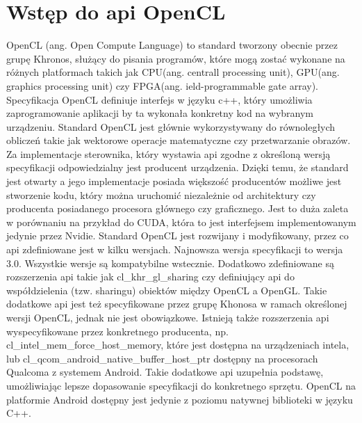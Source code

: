 \section[Wstęp do api OpenCL]{Wstęp do api OpenCL}
OpenCL (ang. Open Compute Language) to standard tworzony obecnie przez grupę Khronos, służący do pisania programów, które mogą zostać wykonane na różnych platformach takich jak CPU(ang. centrall processing unit), GPU(ang. graphics processing unit) czy FPGA(ang. ield-programmable gate array). Specyfikacja OpenCL definiuje interfejs w języku c++, który umożliwia zaprogramowanie aplikacji by ta wykonała konkretny kod na wybranym urządzeniu. Standard OpenCL jest głównie wykorzystywany do równoległych obliczeń takie jak wektorowe operacje matematyczne czy przetwarzanie obrazów. Za implementacje sterownika, który wystawia api zgodne z określoną wersją specyfikacji odpowiedzialny jest producent urządzenia.  Dzięki temu, że standard jest otwarty a jego implementacje posiada większość producentów możliwe jest stworzenie kodu, który można uruchomić niezależnie od architektury czy producenta posiadanego procesora głównego czy graficznego. Jest to duża zaleta w porównaniu na przykład do CUDA, która to jest interfejsem implementowanym jedynie przez Nvidie. Standard OpenCL jest rozwijany i modyfikowany, przez co api zdefiniowane jest w kilku wersjach. Najnowsza wersja specyfikacji to wersja 3.0. Wszystkie wersje są kompatybilne wstecznie. Dodatkowo zdefiniowane są rozszerzenia api takie jak cl\_khr\_gl\_sharing czy definiujący api do współdzielenia (tzw. sharingu) obiektów między OpenCL a OpenGL. Takie dodatkowe api jest też specyfikowane przez grupę Khonosa w ramach określonej wersji OpenCL, jednak nie jest obowiązkowe. Istnieją także rozszerzenia api wyspecyfikowane przez konkretnego producenta, np. cl\_intel\_mem\_force\_host\_memory, które jest dostępna na urządzeniach intela, lub cl\_qcom\_android\_native\_buffer\_host\_ptr dostępny na procesorach Qualcoma z systemem Android. Takie dodatkowe api uzupełnia podstawę, umożliwiając lepsze dopasowanie specyfikacji do konkretnego sprzętu. OpenCL na platformie Android dostępny jest jedynie z poziomu natywnej biblioteki w języku C++.

